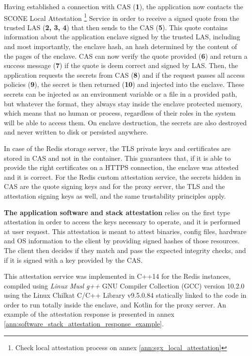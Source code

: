 Having established a connection with \gls{CAS} (\textbf{1}), the application now contacts the SCONE Local Attestation \footnote{Check local attestation process on annex \ref{ann:sgx_local_attestation}} Service in order to receive a signed quote from the trusted \gls{LAS} (\textbf{2, 3, 4}) that then sends to the \gls{CAS} (\textbf{5}). This quote contains information about the application enclave signed by the trusted \gls{LAS}, including and most importantly, the enclave hash, an hash determined by the content of the pages of the enclave. \gls{CAS} can now verify the quote provided (\textbf{6}) and return a success message (\textbf{7}) if the quote is deem correct and signed by \gls{LAS}. Then, the application requests the secrets from \gls{CAS} (\textbf{8}) and if the request passes all access policies (\textbf{9}), the secret is then returned (\textbf{10}) and injected into the enclave. These secrets can be injected as an environment variable or a file in a provided path, but whatever the format, they always stay inside the enclave protected memory, which means that no human or process, regardless of their roles in the system will be able to access them. On enclave destruction, the secrets are also destroyed and never written to disk or persisted anywhere. 

In case of the Redis storage server, the \gls{TLS} private keys and certificates are stored in \gls{CAS} and not in the container. This guarantees that, if it is able to provide the right certificates on a \gls{HTTPS} connection, the enclave was attested and it is correct. For the Redis custom attestation service, the secrets hidden in \gls{CAS} are the quote signing keys and for the proxy server, the \gls{TLS} and the attestation signing keys as well, and the same trustability principles apply.

\textbf{The application software and stack attestation} relies on the first type attestation in order to access the keys necessary to operate, and it is performed at user request. This attestation is meant to attest binaries, config files, hardware and \gls{OS} information to the client by providing signed hashes of those resources. The client then decides if they match and pass the expected integrity checks, and if it is signed with a key provided by the \gls{CAS}.

This attestation service was implemented in C++14 for the Redis instances, compiled using \textit{Linux Musl g++} GNU Compiler Collection (GCC) version 10.2.0 using the Linux Chilkat C/C++ Library v9.5.0.84 statically linked to the code in order to run totally inside the enclave, and Kotlin for the proxy server. An example of the attestation response is presented in annex \ref{ann:software_stack_attestation_response_example}.


